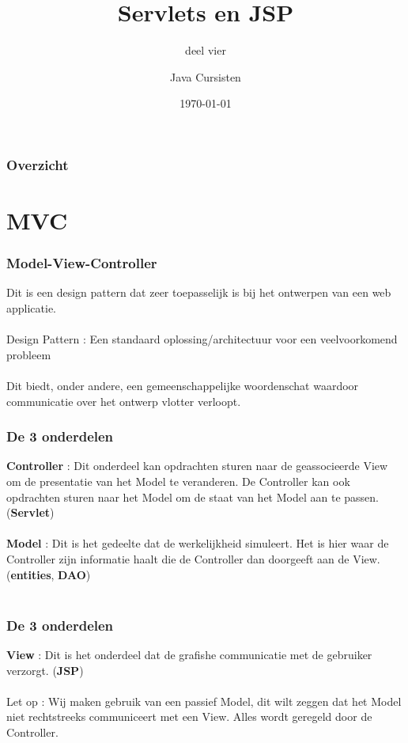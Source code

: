 \documentclass{beamer}
\title{Servlets en JSP}
\subtitle{deel vier}
\author{Java Cursisten}
\institute{INTEC Brussel}
\date{\today}
\begin{document}
\begin{frame}

\titlepage

\end{frame}

\begin{frame}

\frametitle{Overzicht}
{\LARGE \tableofcontents}

\end{frame}


\section{MVC}


\begin{frame}

\frametitle{\textbf{M}odel-\textbf{V}iew-\textbf{C}ontroller}

Dit is een design pattern dat zeer toepasselijk is bij
het ontwerpen van een web applicatie.\\~\\

Design Pattern : Een standaard oplossing/architectuur voor een veelvoorkomend probleem\\~\\

Dit biedt, onder andere, een gemeenschappelijke woordenschat waardoor communicatie over het ontwerp vlotter verloopt.

\end{frame}

\begin{frame}

\frametitle{De 3 onderdelen}

\textbf{Controller} : Dit onderdeel kan opdrachten sturen naar de geassocieerde View om de presentatie van het Model te veranderen. De Controller kan ook opdrachten sturen naar het Model om de staat van het Model aan te passen. (\textbf{Servlet})\\~\\

\textbf{Model} : Dit is het gedeelte dat de werkelijkheid simuleert. Het is hier waar de Controller zijn informatie haalt die de Controller dan doorgeeft aan de View. (\textbf{entities}, \textbf{DAO})\\~\\

\end{frame}


\begin{frame}

\frametitle{De 3 onderdelen}

\textbf{View} : Dit is het onderdeel dat de grafishe communicatie met de gebruiker verzorgt. (\textbf{JSP})\\~\\

Let op : Wij maken gebruik van een passief Model, dit wilt zeggen dat het 
Model niet rechtstreeks communiceert met een View. Alles wordt geregeld door de Controller.

\end{frame}
\end{document}
